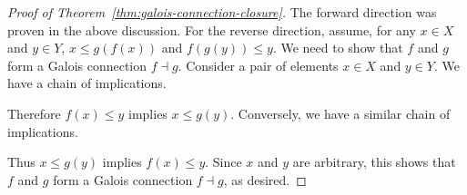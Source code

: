 \documentclass{../thesis-note}
\begin{document}
\begin{proof}[Proof of Theorem~\ref{thm:galois-connection-closure}]
  The forward direction was proven in the above discussion. For the reverse
  direction, assume, for any \(x \in X\) and \(y \in Y\), \(x \leq g(f(x))\) and
  \(f(g(y)) \leq y\). We need to show that \(f\) and \(g\) form a Galois
  connection \(f \dashv g\). Consider a pair of elements \(x \in X\) and \(y \in
  Y\). We have a chain of implications.
  \begin{prooftree}
  \end{prooftree}
  Therefore \(f(x) \leq y\) implies \(x \leq g(y)\). Conversely, we have a
  similar chain of implications.
  \begin{prooftree}
  \end{prooftree}
  Thus \(x \leq g(y)\) implies \(f(x) \leq y\). Since \(x\) and \(y\) are
  arbitrary, this shows that \(f\) and \(g\) form a Galois connection \(f \dashv
  g\), as desired.
\end{proof}
\end{document}
